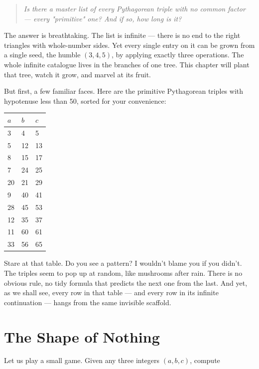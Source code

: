 \begin{quote}
\textit{Is there a master list of every Pythagorean triple with no common factor --- every "primitive" one? And if so, how long is it?}
\end{quote}

The answer is breathtaking. The list is infinite --- there is no end to the right triangles with whole-number sides. Yet every single entry on it can be grown from a single seed, the humble $(3, 4, 5)$, by applying exactly three operations. The whole infinite catalogue lives in the branches of one tree. This chapter will plant that tree, watch it grow, and marvel at its fruit.

But first, a few familiar faces. Here are the primitive Pythagorean triples with hypotenuse less than 50, sorted for your convenience:

\begin{center}
\small
\begin{tabular}{lll}
\toprule
$a$ & $b$ & $c$ \\
\midrule
3 & 4 & 5 \\
5 & 12 & 13 \\
8 & 15 & 17 \\
7 & 24 & 25 \\
20 & 21 & 29 \\
9 & 40 & 41 \\
28 & 45 & 53 \\
12 & 35 & 37 \\
11 & 60 & 61 \\
33 & 56 & 65 \\
\bottomrule
\end{tabular}
\end{center}


Stare at that table. Do you see a pattern? I wouldn't blame you if you didn't. The triples seem to pop up at random, like mushrooms after rain. There is no obvious rule, no tidy formula that predicts the next one from the last. And yet, as we shall see, every row in that table --- and every row in its infinite continuation --- hangs from the same invisible scaffold.


\ornbreak



\section{The Shape of Nothing}


Let us play a small game. Given any three integers $(a, b, c)$, compute

